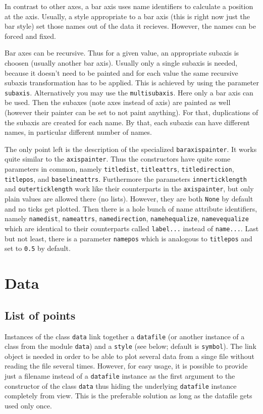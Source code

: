 In contrast to other axes, a bar axis uses name identifiers to
calculate a position at the axis. Usually, a style appropriate to a
bar axis (this is right now just the bar style) set those names out of
the data it recieves. However, the names can be forced and fixed.

Bar axes can be recursive. Thus for a given value, an appropriate
subaxis is choosen (usually another bar axis). Usually only a single
subaxis is needed, because it doesn't need to be painted and for each
value the same recursive subaxis transformation has to be applied.
This is achieved by using the parameter \verb|subaxis|. Alternatively
you may use the \verb|multisubaxis|. Here only a bar axis can be used.
Then the subaxes (note axes instead of axis) are painted as well
(however their painter can be set to not paint anything). For that,
duplications of the subaxis are created for each name. By that, each
subaxis can have different names, in particular different number of
names.

The only point left is the description of the specialized
\verb|baraxispainter|. It works quite similar to the
\verb|axispainter|. Thus the constructors have quite some parameters
in common, namely \verb|titledist|, \verb|titleattrs|,
\verb|titledirection|, \verb|titlepos|, and \verb|baselineattrs|.
Furthermore the parameters \verb|innerticklength| and
\verb|outerticklength| work like their counterparts in the
\verb|axispainter|, but only plain values are allowed there (no
lists). However, they are both \verb|None| by default and no ticks
get plotted. Then there is a hole bunch of name
attribute identifiers, namely \verb|namedist|, \verb|nameattrs|,
\verb|namedirection|, \verb|namehequalize|, \verb|namevequalize| which
are identical to their counterparts called \verb|label...| instead of
\verb|name...|. Last but not least, there is a parameter \verb|namepos|
which is analogous to \verb|titlepos| and set to \verb|0.5| by
default.

\section{Data}
\label{graph:data}

\subsection{List of points}

Instances of the class \verb|data| link together a \verb|datafile| (or
another instance of a class from the module \verb|data|) and a
\verb|style| (see below; default is \verb|symbol|). The link object is
needed in order to be able to plot several data from a singe file
without reading the file several times. However, for easy usage, it is
possible to provide just a filename instead of a \verb|datafile|
instance as the first argument to the constructor of the class
\verb|data| thus hiding the underlying \verb|datafile| instance
completely from view. This is the preferable solution as long as the
datafile gets used only once.

